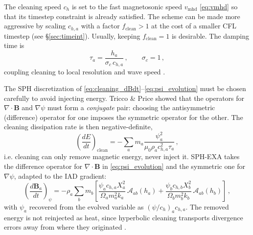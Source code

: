 The cleaning speed $c_h$ is set to the fast magnetosonic speed $v_\mathrm{mhd}$ \eqref{eq:vmhd} so that its timestep constraint is already satisfied. The scheme can be made more aggressive by scaling $c_{h,a}$ with a factor $f_\mathrm{clean}>1$ at the cost of a smaller CFL timestep (see §\ref{sec:timeint}). Usually, keeping $f_\mathrm{clean}=1$ is desirable. %
The damping time is
\begin{equation}
    \tau_a = \frac{h_a}{\sigma_c \, c_{h,a}}\,, \qquad \sigma_c = 1\,,
    \label{eq:tau_cleaning}
\end{equation}
coupling cleaning to local resolution and wave speed \cite{TriccoPrice2012}.

 
The SPH discretization of \eqref{eq:cleaning_dBdt}--\eqref{eq:psi_evolution} must be chosen carefully to avoid injecting energy. Tricco \& Price \cite{TriccoPrice2012} showed that the operators for $\nabla \cdot \mathbf{B}$ and $\nabla \psi$ must form a \emph{conjugate} pair: choosing the antisymmetric (difference) operator for one imposes the symmetric operator for the other. The cleaning dissipation rate is then negative-definite,
\begin{equation}
    \left(\frac{dE}{dt}\right)_\mathrm{clean} = -\sum_a m_a \frac{\psi_a^2}{\mu_0 \rho_a c_{h,a}^2 \tau_a}\,,
    \label{eq:cleaning_dissipation}
\end{equation}
i.e. cleaning can only remove magnetic energy, never inject it. SPH-EXA takes the difference operator for $\nabla \cdot \mathbf{B}$ in \eqref{eq:psi_evolution} and the symmetric one for $\nabla \psi$, adapted to the IAD gradient:
\begin{equation}
    \left(\frac{d\mathbf{B}_a}{dt}\right)_\psi = -\rho_a \sum_b m_b \left[\frac{\psi_a c_{h,a} X_a^2}{\Omega_a m_a^2 k_a}\, \boldsymbol{\mathcal{A}}_{ab}(h_a) + \frac{\psi_b c_{h,b} X_b^2}{\Omega_b m_b^2 k_b}\, \boldsymbol{\mathcal{A}}_{ab}(h_b)\right]\,,
    \label{eq:cleaning_grad_psi}
\end{equation}
with $\psi_a$ recovered from the evolved variable as $(\psi/c_h)_a c_{h,a}$. The removed energy is not reinjected as heat, since hyperbolic cleaning transports divergence errors away from where they originated \cite{TriccoPrice2012}.


